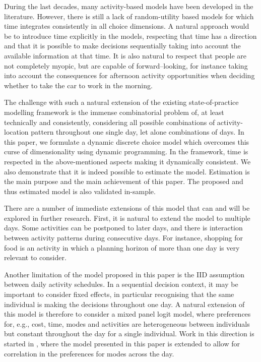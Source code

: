 During the last decades, many activity-based models have been developed in the literature. However, there is still a lack of random-utility based models for which time integrates consistently in all choice dimensions. A natural approach would be to introduce time explicitly in the models, respecting that time has a direction and that it is possible to make decisions sequentially taking into account the available information at that time. It is also natural to respect that people are not completely myopic, but are capable of forward--looking, for instance taking into account the consequences for afternoon activity opportunities when deciding whether to take the car to work in the morning. 

The challenge with such a natural extension of the existing state-of-practice modelling framework is the immense combinatorial problem of, at least technically and consistently, considering all possible combinations of activity-location pattern throughout one single day, let alone combinations of days. In this paper, we formulate a dynamic discrete choice model which overcomes this curse of dimensionality using dynamic programming. In the framework, time is respected in the above-mentioned aspects making it dynamically consistent. 
We also demonstrate that it is indeed possible to estimate the model. Estimation is the main purpose and the main achievement of this paper. The proposed and thus estimated model is also validated in-sample. 

There are a number of immediate extensions of this model that can and will be explored in further research. First, it is natural to extend the model to multiple days. Some activities can be postponed to later days, and there is interaction between activity patterns during consecutive days. For instance, shopping for food is an activity in which a planning horizon of more than one day is very relevant to consider. 

Another limitation of the model proposed in this paper is the IID assumption between daily activity schedules. In a sequential decision context, it may be important to consider fixed effects, in particular recognising that the same individual is making the decisions throughout one day. A natural extension of this model is therefore to consider a mixed panel logit model, where preferences for, e.g., cost, time, modes and activities are heterogeneous between individuals but constant throughout the day for a single individual. Work in this direction is started in \citet{maelleMixed17}, where the model presented in this paper is extended to allow for correlation in the preferences for modes across the day. 

